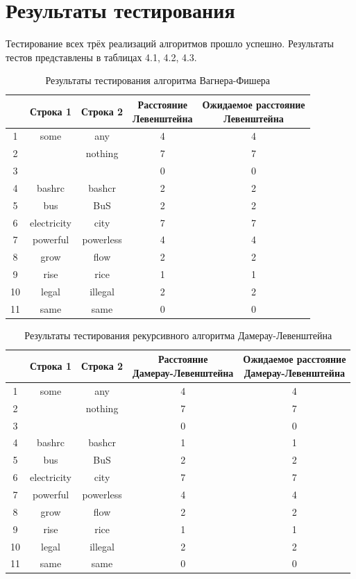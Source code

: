 \section{Результаты тестирования}
Тестирование всех трёх реализаций алгоритмов прошло успешно. Результаты тестов представлены в таблицах 4.1, 4.2, 4.3.

\begin{table}[H]
    \caption{Результаты тестирования алгоритма Вагнера-Фишера}
	\begin{tabular}{|c|c|c|c|c|}
 	\hline
    \No{} & Строка 1 & Строка 2 & \makecell{Расстояние\\Левенштейна} & \makecell{Ожидаемое расстояние\\Левенштейна} \\
 	\hline
 	1 & some & any & 4 & 4\\
 	\hline
 	2 & & nothing & 7 & 7\\
 	\hline
 	3 & & & 0 & 0\\
 	\hline
 	4 & bashrc & bashcr & 2 & 2\\
 	\hline
 	5 & bus & BuS & 2 & 2\\
 	\hline
 	6 & electricity & city & 7 & 7\\
 	\hline
 	7 & powerful & powerless & 4 & 4\\
 	\hline
 	8 & grow & flow & 2 & 2\\
 	\hline
 	9 & rise & rice & 1 & 1\\
 	\hline
    10 & legal & illegal & 2 & 2\\
 	\hline
    11 & same & same & 0 & 0\\
    \hline
	\end{tabular}
\end{table}

\begin{table}[H]
    \caption{Результаты тестирования рекурсивного алгоритма Дамерау-Левенштейна}
	\begin{tabular}{|c|c|c|c|c|}
 	\hline
    \No{} & Строка 1 & Строка 2 & \makecell{Расстояние\\Дамерау-Левенштейна} & \makecell{Ожидаемое расстояние\\Дамерау-Левенштейна} \\
 	\hline
 	1 & some & any & 4 & 4\\
 	\hline
 	2 & & nothing & 7 & 7\\
 	\hline
 	3 & & & 0 & 0\\
 	\hline
 	4 & bashrc & bashcr & 1 & 1\\
 	\hline
 	5 & bus & BuS & 2 & 2\\
 	\hline
 	6 & electricity & city & 7 & 7\\
 	\hline
 	7 & powerful & powerless & 4 & 4\\
 	\hline
 	8 & grow & flow & 2 & 2\\
 	\hline
 	9 & rise & rice & 1 & 1\\
 	\hline
    10 & legal & illegal & 2 & 2\\
 	\hline
    11 & same & same & 0 & 0\\
    \hline
	\end{tabular}
\end{table}

